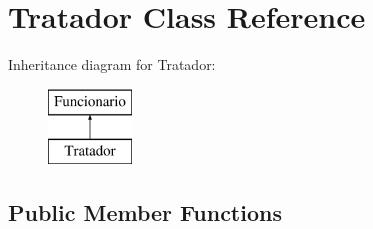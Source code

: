 \hypertarget{class_tratador}{}\section{Tratador Class Reference}
\label{class_tratador}
Inheritance diagram for Tratador\+:\begin{figure}[H]
\begin{center}
\leavevmode
\includegraphics[height=2.000000cm]{class_tratador}
\end{center}
\end{figure}
\subsection*{Public Member Functions}
